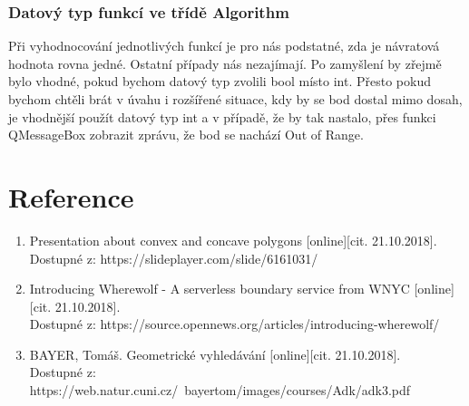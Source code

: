 \documentclass[a4paper, 12pt]{article}
\begin{document}
\subsubsection{Datový typ funkcí ve třídě Algorithm}
Při vyhodnocování jednotlivých funkcí je pro nás podstatné, zda je návratová hodnota rovna jedné. Ostatní případy nás nezajímají. Po zamyšlení by zřejmě bylo vhodné, pokud bychom datový typ zvolili bool místo int. Přesto pokud bychom chtěli brát v úvahu i rozšířené situace, kdy by se bod dostal mimo dosah, je vhodnější použít datový typ int a v případě, že by tak nastalo, přes funkci QMessageBox zobrazit zprávu, že bod se nachází Out of Range. 


\clearpage
\section{Reference}

\begin{enumerate}
\item  Presentation about convex and concave polygons [online][cit. 21.10.2018]. \\
Dostupné z: https://slideplayer.com/slide/6161031/  \\
\item  Introducing Wherewolf - A serverless boundary service from WNYC [online][cit. 21.10.2018]. \\
Dostupné z: https://source.opennews.org/articles/introducing-wherewolf/  \\
\item  BAYER, Tomáš. Geometrické vyhledávání [online][cit. 21.10.2018]. \\
Dostupné z: https://web.natur.cuni.cz/~bayertom/images/courses/Adk/adk3.pdf  \\

\end{enumerate}
\end{document}
